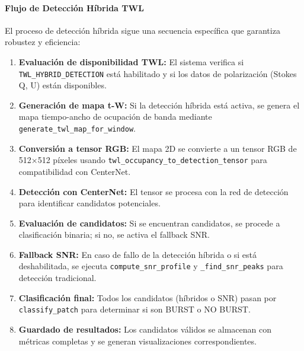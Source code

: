 \paragraph{Flujo de Detección Híbrida TWL}

El proceso de detección híbrida sigue una secuencia específica que garantiza robustez y eficiencia:

\begin{enumerate}
\item \textbf{Evaluación de disponibilidad TWL:} El sistema verifica si \texttt{TWL\_HYBRID\_DETECTION} está habilitado y si los datos de polarización (Stokes Q, U) están disponibles.
\item \textbf{Generación de mapa t-W:} Si la detección híbrida está activa, se genera el mapa tiempo-ancho de ocupación de banda mediante \texttt{generate\_twl\_map\_for\_window}.
\item \textbf{Conversión a tensor RGB:} El mapa 2D se convierte a un tensor RGB de 512×512 píxeles usando \texttt{twl\_occupancy\_to\_detection\_tensor} para compatibilidad con CenterNet.
\item \textbf{Detección con CenterNet:} El tensor se procesa con la red de detección para identificar candidatos potenciales.
\item \textbf{Evaluación de candidatos:} Si se encuentran candidatos, se procede a clasificación binaria; si no, se activa el fallback SNR.
\item \textbf{Fallback SNR:} En caso de fallo de la detección híbrida o si está deshabilitada, se ejecuta \texttt{compute\_snr\_profile} y \texttt{\_find\_snr\_peaks} para detección tradicional.
\item \textbf{Clasificación final:} Todos los candidatos (híbridos o SNR) pasan por \texttt{classify\_patch} para determinar si son BURST o NO BURST.
\item \textbf{Guardado de resultados:} Los candidatos válidos se almacenan con métricas completas y se generan visualizaciones correspondientes.
\end{enumerate}

